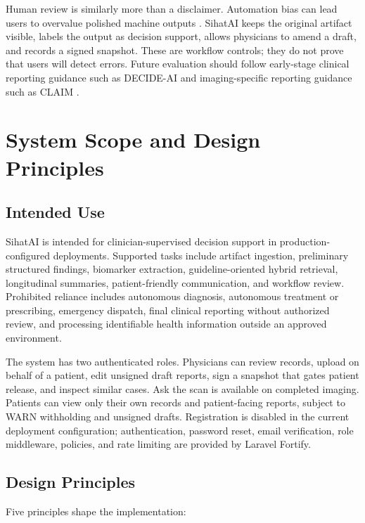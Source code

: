 \documentclass[conference]{IEEEtran}
\begin{document}
Human review is similarly more than a disclaimer. Automation bias can lead users to overvalue polished machine outputs \cite{cabitza2017unintended}. SihatAI keeps the original artifact visible, labels the output as decision support, allows physicians to amend a draft, and records a signed snapshot. These are workflow controls; they do not prove that users will detect errors. Future evaluation should follow early-stage clinical reporting guidance such as DECIDE-AI \cite{vasey2022decideai} and imaging-specific reporting guidance such as CLAIM \cite{mongan2020claim}.

\section{System Scope and Design Principles}

\subsection{Intended Use}

SihatAI is intended for clinician-supervised decision support in production-configured deployments. Supported tasks include artifact ingestion, preliminary structured findings, biomarker extraction, guideline-oriented hybrid retrieval, longitudinal summaries, patient-friendly communication, and workflow review. Prohibited reliance includes autonomous diagnosis, autonomous treatment or prescribing, emergency dispatch, final clinical reporting without authorized review, and processing identifiable health information outside an approved environment.

The system has two authenticated roles. Physicians can review records, upload on behalf of a patient, edit unsigned draft reports, sign a snapshot that gates patient release, and inspect similar cases. Ask the scan is available on completed imaging. Patients can view only their own records and patient-facing reports, subject to WARN withholding and unsigned drafts. Registration is disabled in the current deployment configuration; authentication, password reset, email verification, role middleware, policies, and rate limiting are provided by Laravel Fortify.

\subsection{Design Principles}

Five principles shape the implementation:
\end{document}
